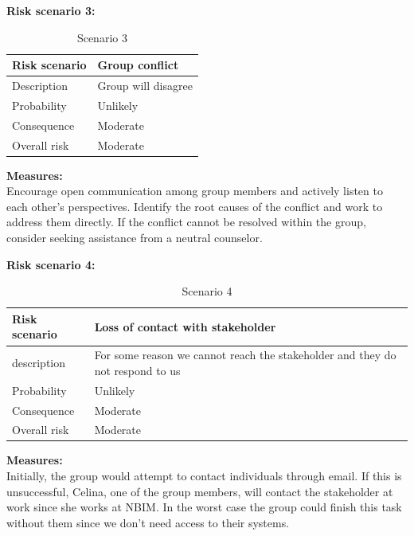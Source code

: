 \vspace{2cm}
\begin{table}[!ht]
    \raggedright
    \textbf{Risk scenario 3:}
    \\
    \centering
    \begin{tabular}{|p{}|p{}|}
    \hline
        Risk scenario & Group conflict \\ \hline
        Description & Group will disagree   \\ \hline
        Probability & Unlikely \\ \hline
        Consequence & Moderate \\ \hline
        Overall risk &  \cellcolor{yellow!} Moderate \\ \hline
    \end{tabular}
    \caption{Scenario 3}
    \raggedright
    \textbf{Measures:}
    \\ 
    Encourage open communication among group members and actively listen to each other's perspectives. Identify the root causes of the conflict and work to address them directly. If the conflict cannot be resolved within the group, consider seeking assistance from a neutral counselor.
\end{table}

\vspace{2cm}
\begin{table}[!ht]
    \raggedright
    \textbf{Risk scenario 4:}
    \\
    \centering
    \begin{tabular}{|p{}|p{}|}
    \hline
        Risk scenario & Loss of contact with stakeholder\\ \hline
        description & For some reason we cannot reach the stakeholder and they do not respond to us  \\ \hline
        Probability & Unlikely  \\ \hline
        Consequence & Moderate  \\ \hline
        Overall risk & \cellcolor{yellow!} Moderate \\ \hline
    \end{tabular}
    \caption{Scenario 4}
    \raggedright
    \textbf{Measures:}
    \\ 
    Initially, the group would attempt to contact individuals through email. If this is unsuccessful, Celina, one of the group members, will contact the stakeholder at work since she works at NBIM. In the worst case the group could finish this task without them since we don't need access to their systems.
\end{table}

